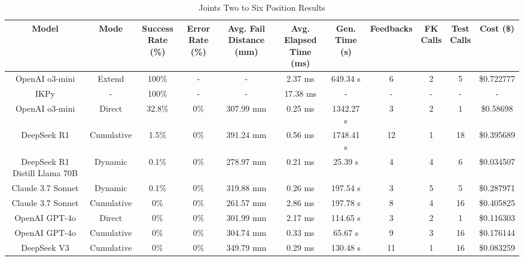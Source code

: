 \begin{landscape}
\begin{table}[H]
\tiny
\renewcommand{\arraystretch}{1.2}
\caption{Joints Two to Six Position Results}
\begin{center}
\begin{tabular}{|c|c|c|c|c|c|c|c|c|c|c|}
    \hline
    \textbf{Model} & 
    \textbf{Mode} & 
    \makecell{\textbf{Success}\\\textbf{Rate (\%)}} &
    \makecell{\textbf{Error}\\\textbf{Rate (\%)}} &
    \makecell{\textbf{Avg. Fail}\\\textbf{Distance (mm)}} &
    \makecell{\textbf{Avg. Elapsed}\\\textbf{Time (ms)}} &
    \makecell{\textbf{Gen.}\\\textbf{Time (s)}} &
    \textbf{Feedbacks} &
    \makecell{\textbf{FK}\\\textbf{Calls}} &
    \makecell{\textbf{Test}\\\textbf{Calls}} &
    \textbf{Cost (\$)} \\
    \hline
    OpenAI o3-mini & Extend & 100\% & - & - & 2.37 ms & 649.34 s & 6 & 2 & 5 & \$0.722777 \\
    \hline
    IKPy & - & 100\% & - & - & 17.38 ms & - & - & - & - & - \\
    \hline
    OpenAI o3-mini & Direct & 32.8\% & 0\% & 307.99 mm & 0.25 ms & 1342.27 s & 3 & 2 & 1 & \$0.58698 \\
    \hline
    DeepSeek R1 & Cumulative & 1.5\% & 0\% & 391.24 mm & 0.56 ms & 1748.41 s & 12 & 1 & 18 & \$0.395689 \\
    \hline
    DeepSeek R1 Distill Llama 70B & Dynamic & 0.1\% & 0\% & 278.97 mm & 0.21 ms & 25.39 s & 4 & 4 & 6 & \$0.034507 \\
    \hline
    Claude 3.7 Sonnet & Dynamic & 0.1\% & 0\% & 319.88 mm & 0.26 ms & 197.54 s & 3 & 5 & 5 & \$0.287971 \\
    \hline
    Claude 3.7 Sonnet & Cumulative & 0\% & 0\% & 261.57 mm & 2.86 ms & 197.78 s & 8 & 4 & 16 & \$0.405825 \\
    \hline
    OpenAI GPT-4o & Direct & 0\% & 0\% & 301.99 mm & 2.17 ms & 114.65 s & 3 & 2 & 1 & \$0.116303 \\
    \hline
    OpenAI GPT-4o & Cumulative & 0\% & 0\% & 304.74 mm & 0.33 ms & 65.67 s & 9 & 3 & 16 & \$0.176144 \\
    \hline
    DeepSeek V3 & Cumulative & 0\% & 0\% & 349.79 mm & 0.29 ms & 130.48 s & 11 & 1 & 16 & \$0.083259 \\
    \hline

\end{tabular}
\end{center}
\end{table}
\end{landscape}
